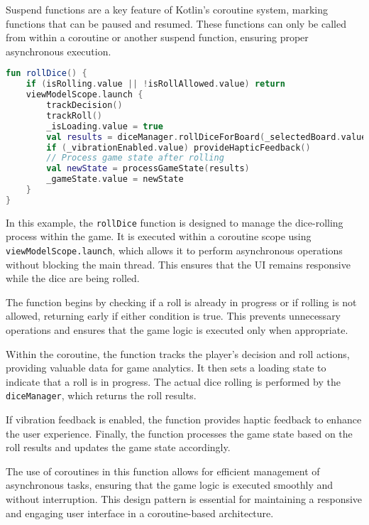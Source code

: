 Suspend functions are a key feature of Kotlin's coroutine system, marking functions that can be paused and resumed. These functions can only be called from within a coroutine or another suspend function, ensuring proper asynchronous execution.
\begin{lstlisting}[language=Kotlin, caption={Suspend Function Example}, label=lst:suspend_function]
fun rollDice() {
    if (isRolling.value || !isRollAllowed.value) return
    viewModelScope.launch {
        trackDecision()
        trackRoll()
        _isLoading.value = true
        val results = diceManager.rollDiceForBoard(_selectedBoard.value)
        if (_vibrationEnabled.value) provideHapticFeedback()
        // Process game state after rolling
        val newState = processGameState(results)
        _gameState.value = newState
    }
}
\end{lstlisting}
\label{lst:suspend_function}

In this example, the \texttt{rollDice} function is designed to manage the dice-rolling process within the game. It is executed within a coroutine scope using \texttt{viewModelScope.launch}, which allows it to perform asynchronous operations without blocking the main thread. This ensures that the UI remains responsive while the dice are being rolled.

The function begins by checking if a roll is already in progress or if rolling is not allowed, returning early if either condition is true. This prevents unnecessary operations and ensures that the game logic is executed only when appropriate.

Within the coroutine, the function tracks the player's decision and roll actions, providing valuable data for game analytics. It then sets a loading state to indicate that a roll is in progress. The actual dice rolling is performed by the \texttt{diceManager}, which returns the roll results.

If vibration feedback is enabled, the function provides haptic feedback to enhance the user experience. Finally, the function processes the game state based on the roll results and updates the game state accordingly.

The use of coroutines in this function allows for efficient management of asynchronous tasks, ensuring that the game logic is executed smoothly and without interruption. This design pattern is essential for maintaining a responsive and engaging user interface in a coroutine-based architecture.

